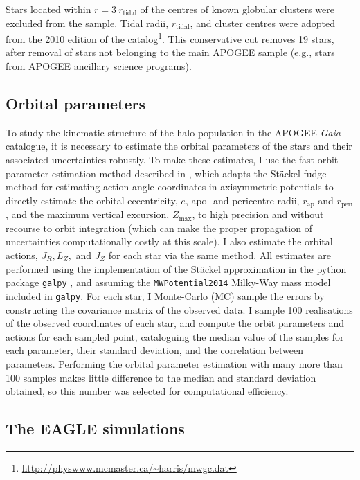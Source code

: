 Stars located within $r = 3\ r_{\mathrm{tidal}}$ of the centres of
known globular clusters were excluded from the sample.  Tidal radii,
$r_\mathrm{tidal}$, and cluster centres were adopted from the 2010
edition of the \citet{1996AJ....112.1487H}
catalog\footnote{\url{http://physwww.mcmaster.ca/~harris/mwgc.dat}}.  This
conservative cut removes 19 stars, after removal of stars not
belonging to the main APOGEE sample (e.g., stars from APOGEE ancillary
science programs).

\subsection{Orbital parameters}

To study the kinematic structure of the halo population in the
APOGEE-\emph{Gaia} catalogue, it is necessary to estimate the orbital
parameters of the stars and their associated uncertainties robustly.
To make these estimates, I use the fast orbit parameter estimation
method described in \citet{2018arXiv180202592M}, which adapts the St\"ackel
fudge method for estimating action-angle coordinates in axisymmetric
potentials \citep[presented in][]{2012MNRAS.426.1324B} to directly
estimate the orbital eccentricity, $e$, apo- and pericentre radii,
$r_\mathrm{ap}$ and $r_\mathrm{peri}$, and the maximum vertical
excursion, $Z_\mathrm{max}$, to high precision and without recourse
to orbit integration (which can make the proper propagation of
uncertainties computationally costly at this scale).  I also
estimate the orbital actions, $J_{R}, L_{Z},$ and $J_{Z}$ for each
star via the same method. All estimates are performed using the
implementation of the St\"ackel approximation in the python package
\texttt{galpy} \citep{2015ApJS..216...29B}, and assuming the
\texttt{MWPotential2014} Milky-Way mass model included in \texttt{galpy}.
For each star, I Monte-Carlo (MC) sample the errors by constructing
the covariance matrix of the observed data.  I sample 100 realisations
of the observed coordinates of each star, and compute the orbit
parameters and actions for each sampled point, cataloguing the
median value of the samples for each parameter, their standard
deviation, and the correlation between parameters.  Performing the
orbital parameter estimation with many more than 100 samples makes
little difference to the median and standard deviation obtained,
so this number was selected for computational efficiency.

\subsection{The EAGLE simulations} 
\label{eagledata} 

